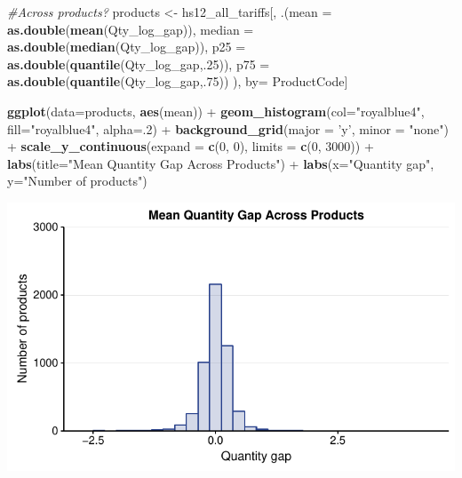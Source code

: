 \documentclass[10pt,]{article}
\newenvironment{Shaded}{\begin{snugshade}}{\end{snugshade}}
\newcommand{\KeywordTok}[1]{\textcolor[rgb]{0.13,0.29,0.53}{\textbf{{#1}}}}
\newcommand{\DataTypeTok}[1]{\textcolor[rgb]{0.13,0.29,0.53}{{#1}}}
\newcommand{\DecValTok}[1]{\textcolor[rgb]{0.00,0.00,0.81}{{#1}}}
\newcommand{\StringTok}[1]{\textcolor[rgb]{0.31,0.60,0.02}{{#1}}}
\newcommand{\CommentTok}[1]{\textcolor[rgb]{0.56,0.35,0.01}{\textit{{#1}}}}
\newcommand{\NormalTok}[1]{{#1}}
\begin{document}
\begin{Shaded}
\begin{Highlighting}[]
\CommentTok{#Across products?}
\NormalTok{products <-}\StringTok{ }\NormalTok{hs12_all_tariffs[, .(}\DataTypeTok{mean =} \KeywordTok{as.double}\NormalTok{(}\KeywordTok{mean}\NormalTok{(Qty_log_gap)),}
                                 \DataTypeTok{median =} \KeywordTok{as.double}\NormalTok{(}\KeywordTok{median}\NormalTok{(Qty_log_gap)),}
                                 \DataTypeTok{p25 =} \KeywordTok{as.double}\NormalTok{(}\KeywordTok{quantile}\NormalTok{(Qty_log_gap,.}\DecValTok{25}\NormalTok{)),}
                                 \DataTypeTok{p75 =} \KeywordTok{as.double}\NormalTok{(}\KeywordTok{quantile}\NormalTok{(Qty_log_gap,.}\DecValTok{75}\NormalTok{))}
\NormalTok{),}
\NormalTok{by=}\StringTok{ }\NormalTok{ProductCode]}

\KeywordTok{ggplot}\NormalTok{(}\DataTypeTok{data=}\NormalTok{products, }\KeywordTok{aes}\NormalTok{(mean)) +}
\StringTok{  }\KeywordTok{geom_histogram}\NormalTok{(}\DataTypeTok{col=}\StringTok{"royalblue4"}\NormalTok{,}
                 \DataTypeTok{fill=}\StringTok{"royalblue4"}\NormalTok{,}
                 \DataTypeTok{alpha=}\NormalTok{.}\DecValTok{2}\NormalTok{) +}
\StringTok{  }\KeywordTok{background_grid}\NormalTok{(}\DataTypeTok{major =} \StringTok{'y'}\NormalTok{, }\DataTypeTok{minor =} \StringTok{"none"}\NormalTok{) +}
\StringTok{  }\KeywordTok{scale_y_continuous}\NormalTok{(}\DataTypeTok{expand =} \KeywordTok{c}\NormalTok{(}\DecValTok{0}\NormalTok{, }\DecValTok{0}\NormalTok{), }\DataTypeTok{limits =} \KeywordTok{c}\NormalTok{(}\DecValTok{0}\NormalTok{, }\DecValTok{3000}\NormalTok{))  +}
\StringTok{  }\KeywordTok{labs}\NormalTok{(}\DataTypeTok{title=}\StringTok{"Mean Quantity Gap Across Products"}\NormalTok{) +}
\StringTok{  }\KeywordTok{labs}\NormalTok{(}\DataTypeTok{x=}\StringTok{"Quantity gap"}\NormalTok{, }\DataTypeTok{y=}\StringTok{"Number of products"}\NormalTok{)}
\end{Highlighting}
\end{Shaded}

\begin{center}\includegraphics{Figs/qty_summary-2} \end{center}
\end{document}
